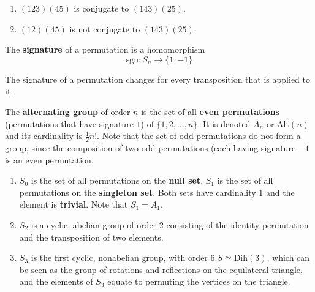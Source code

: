   \begin{example}
    \begin{enumerate}
      \item $(1 2 3) (4 5)$ is conjugate to $(1 4 3) (2 5)$.
      \item $(1 2) (4 5)$ is not conjugate to $(1 4 3) (2 5)$. 
    \end{enumerate}
  \end{example}

  \begin{definition}
    The \textbf{signature} of a permutation is a homomorphism
    \begin{equation}
      \text{sgn}: S_{n} \longrightarrow \{1, -1\}
    \end{equation}
  \end{definition}

  \begin{lemma}
    The signature of a permutation changes for every transposition that is applied to it. 
  \end{lemma}

  \begin{definition}
    The \textbf{alternating group} of order $n$ is the set of all \textbf{even permutations} (permutations that have signature $1$) of $\{1, 2, ..., n\}$. It is denoted $A_{n}$ or Alt$(n)$ and its cardinality is $\frac{1}{2} n!$. Note that the set of odd permutations do not form a group, since the composition of two odd permutations (each having signature $-1$ is an even permutation. 
  \end{definition}

  \begin{example}
    \begin{enumerate}
      \item $S_{0}$ is the set of all permutations on the \textbf{null set}. $S_{1}$ is the set of all permutations on the \textbf{singleton set}. Both sets have cardinality 1 and the element is \textbf{trivial}. Note that $S_{1} = A_{1}$. 
      \item $S_{2}$ is a cyclic, abelian group of order 2 consisting of the identity permutation and the transposition of two elements. 
      \item $S_{3}$ is the first cyclic, nonabelian group, with order 6.$S \simeq \text{Dih}(3)$, which can be seen as the group of rotations and reflections on the equilateral triangle, and the elements of $S_{3}$ equate to permuting the vertices on the triangle. 
    \end{enumerate}
  \end{example}

